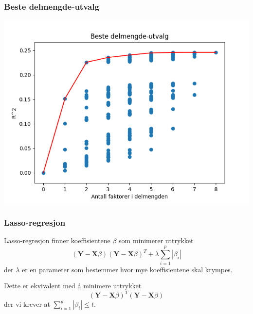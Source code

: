\documentclass[aspectratio=169]{beamer}
\begin{document}
\begin{frame}
  \frametitle{Beste delmengde-utvalg}
  \begin{center}
    \includegraphics[height=0.8\textheight]{best_subset.png}
  \end{center}
\end{frame}

\begin{frame}
  \frametitle{Lasso-regresjon}
  Lasso-regresjon finner koeffisientene \(\beta\) som minimerer uttrykket
  \begin{equation}
    (\textbf{Y} - \textbf{X}\beta)(\textbf{Y} - \textbf{X}\beta)^T + \lambda \sum_{i=1}^p |\beta_i|
  \end{equation}
  der \(\lambda\) er en parameter som bestemmer hvor mye koeffisientene skal krympes.
  
  \pause
  Dette er ekvivalent med å minimere uttrykket
  \begin{equation}
    (\textbf{Y} - \textbf{X}\beta)^T (\textbf{Y} - \textbf{X}\beta)
  \end{equation}
  der vi krever at \(\sum_{i=1}^p |\beta_i| \leq t\).
\end{frame}
\end{document}
